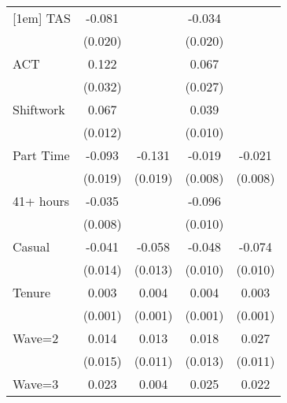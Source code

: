 {\begin{tabular}{l*{4}{c}}
[1em]
TAS                 &      -0.081\sym{***}&                     &      -0.034         &                     \\
                    &     (0.020)         &                     &     (0.020)         &                     \\
[1em]
ACT                 &       0.122\sym{***}&                     &       0.067\sym{*}  &                     \\
                    &     (0.032)         &                     &     (0.027)         &                     \\
[1em]
Shiftwork           &       0.067\sym{***}&                     &       0.039\sym{***}&                     \\
                    &     (0.012)         &                     &     (0.010)         &                     \\
[1em]
Part Time           &      -0.093\sym{***}&      -0.131\sym{***}&      -0.019\sym{*}  &      -0.021\sym{**} \\
                    &     (0.019)         &     (0.019)         &     (0.008)         &     (0.008)         \\
[1em]
41+ hours           &      -0.035\sym{***}&                     &      -0.096\sym{***}&                     \\
                    &     (0.008)         &                     &     (0.010)         &                     \\
[1em]
Casual              &      -0.041\sym{**} &      -0.058\sym{***}&      -0.048\sym{***}&      -0.074\sym{***}\\
                    &     (0.014)         &     (0.013)         &     (0.010)         &     (0.010)         \\
[1em]
Tenure              &       0.003\sym{***}&       0.004\sym{***}&       0.004\sym{***}&       0.003\sym{***}\\
                    &     (0.001)         &     (0.001)         &     (0.001)         &     (0.001)         \\
[1em]
Wave=2              &       0.014         &       0.013         &       0.018         &       0.027\sym{*}  \\
                    &     (0.015)         &     (0.011)         &     (0.013)         &     (0.011)         \\
[1em]
Wave=3              &       0.023         &       0.004         &       0.025         &       0.022         \\

\end{tabular}}
